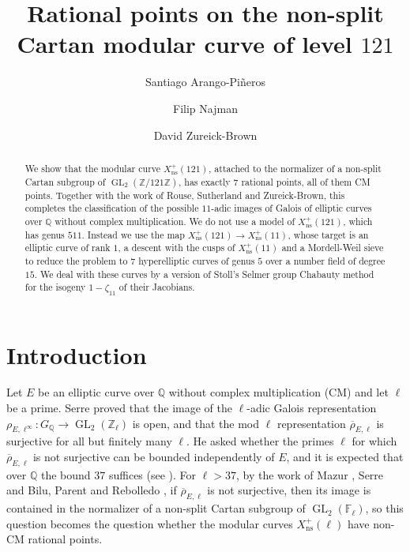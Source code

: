 \documentclass[11pt,reqno]{amsart}
\title[Rational points on $\Xns{121}$]{Rational points on the non-split Cartan modular curve of level $121$}
\author{Santiago Arango-Pi\~neros}
\author{Filip Najman}
\author{David Zureick-Brown}
\DeclareMathOperator{\GL}{GL}
\newcommand{\Q}{\mathbb{Q}}
\newcommand{\Z}{\mathbb{Z}}
\newcommand{\F}{\mathbb{F}}
\newcommand{\ns}{\mathrm{ns}}
\newcommand{\Xns}[1]{X_{\ns}^+(#1)}
\theoremstyle{definition}
\numberwithin{equation}{section}
\begin{document}
\begin{abstract}
We show that the modular curve $\Xns{121}$, attached to the normalizer of a non-split Cartan subgroup of $\GL_2(\Z/121\Z)$, has exactly $7$ rational points, all of them CM points. Together with the work of Rouse, Sutherland and Zureick-Brown, this completes the classification of the possible $11$-adic images of Galois of elliptic curves over $\Q$ without complex multiplication. We do not use a model of $\Xns{121}$, which has genus $511$. Instead we use the map $\Xns{121}\rightarrow \Xns{11}$, whose target is an elliptic curve of rank $1$, a descent with the cusps of $\Xns{11}$ and a Mordell-Weil sieve to reduce the problem to $7$ hyperelliptic curves of genus $5$ over a number field of degree $15$. We deal with these curves by a version of Stoll's Selmer group Chabauty method for the isogeny $1-\zeta_{11}$ of their Jacobians.
\end{abstract}

\maketitle

\section{Introduction}

Let $E$ be an elliptic curve over $\Q$ without complex multiplication (CM) and let $\ell$ be a prime. Serre \cite{Serre72} proved that the image of the $\ell$-adic Galois representation $\rho_{E,\ell^\infty}\colon G_\Q\rightarrow \GL_2(\Z_\ell)$ is open, and that the mod $\ell$ representation $\overline\rho_{E,\ell}$ is surjective for all but finitely many $\ell$. He asked whether the primes $\ell$ for which $\overline\rho_{E,\ell}$ is not surjective can be bounded independently of $E$, and it is expected that over $\Q$ the bound $37$ suffices (see \cite{Zywina15}). For $\ell>37$, by the work of Mazur \cite{Mazur78}, Serre \cite{Serre72} and Bilu, Parent and Rebolledo \cite{BPR13}, if $\overline\rho_{E,\ell}$ is not surjective, then its image is contained in the normalizer of a non-split Cartan subgroup of $\GL_2(\F_\ell)$, so this question becomes the question whether the modular curves $\Xns{\ell}$ have non-CM rational points.
\end{document}
